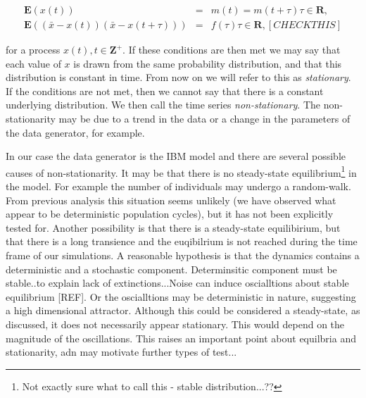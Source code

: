 \begin{eqnarray}
	\mathbf{E}(x(t)) &=& m(t) = m(t + \tau)  \tau \in \mathbf{R}, \\
	\mathbf{E}((\bar{x}-x(t))(\bar{x}-x(t+\tau))) &=& f(\tau)  \tau \in \mathbf{R}, [CHECKTHIS]
\end{eqnarray}

for a process $x(t), t \in \mathbf{Z}^+$. If these conditions are then met we may say that each value of $x$ is drawn from the same probability distribution, and that this distribution is constant in time. From now on we will refer to this as \emph{stationary}. If the conditions are not met, then we cannot say that there is a constant underlying distribution. We then call the time series \emph{non-stationary}. The non-stationarity may be due to a trend in the data or a change in the parameters of the data generator, for example. 

In our case the data generator is the IBM model and there are several possible causes of non-stationarity. It may be that there is no steady-state equilibrium\footnote{Not exactly sure what to call this - stable distribution...??} in the model. For example the number of individuals may undergo a random-walk. From previous analysis this situation seems unlikely (we have observed what appear to be deterministic population cycles), but it has not been explicitly tested for. Another possibility is that there is a steady-state equilibirium, but that there is a long transience and the euqibilrium is not reached during the time frame of our simulations. A reasonable hypothesis is that the dynamics contains a deterministic and a stochastic component. Determinsitic component must be stable..to explain lack of extinctions...Noise can induce oscialltions about stable equilibrium [REF]. Or the oscialltions may be deterministic in nature, suggesting a high dimensional attractor. Although this could be considered a steady-state, as discussed, it does not necessarily appear stationary. This would depend on the magnitude of the oscillations. This raises an important point about equilbria and stationarity, adn may motivate further types of test...


